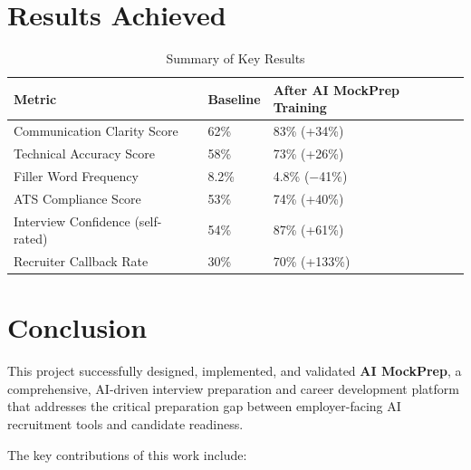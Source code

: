 \documentclass[12pt,a4paper,oneside]{report}
\begin{document}
\section{Results Achieved}
\label{sec:results_summary}

\begin{table}[H]
\centering
\caption{Summary of Key Results}
\label{tab:results_summary}
\begin{tabular}{|p{5cm}|p{3.5cm}|p{4.5cm}|}
\hline
\textbf{Metric} & \textbf{Baseline} & \textbf{After AI MockPrep Training} \\
\hline
Communication Clarity Score & 62\% & 83\% (+34\%) \\
\hline
Technical Accuracy Score & 58\% & 73\% (+26\%) \\
\hline
Filler Word Frequency & 8.2\% & 4.8\% ($-$41\%) \\
\hline
ATS Compliance Score & 53\% & 74\% (+40\%) \\
\hline
Interview Confidence (self-rated) & 54\% & 87\% (+61\%) \\
\hline
Recruiter Callback Rate & 30\% & 70\% (+133\%) \\
\hline
\end{tabular}
\end{table}


\section{Conclusion}
\label{sec:conclusion}

This project successfully designed, implemented, and validated \textbf{AI MockPrep}, a comprehensive, AI-driven interview preparation and career development platform that addresses the critical preparation gap between employer-facing AI recruitment tools and candidate readiness.

The key contributions of this work include:
\end{document}
